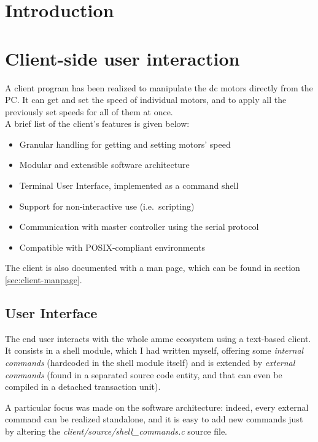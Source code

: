 \documentclass[binding=0.6cm,Lau]{sapthesis}
\begin{document}
\tableofcontents
\listoffigures
\listoftables

\mainmatter

\chapter{Introduction}
\label{ch:intro}


\chapter{Client-side user interaction}
\label{ch:client}
A client program has been realized to manipulate the dc motors directly from the
PC. It can get and set the speed of individual motors, and to apply all the
previously set speeds for all of them at once.\\ A brief list of the
client's features is given below:
\begin{itemize}
  \item Granular handling for getting and setting motors' speed
  \item Modular and extensible software architecture
  \item Terminal User Interface, implemented as a command shell
  \item Support for non-interactive use (i.e.\ scripting)
  \item Communication with master controller using the serial protocol
  \item Compatible with POSIX-compliant environments
\end{itemize}
The client is also documented with a man page, which can be found in section
\ref{sec:client-manpage}.

\section{User Interface}
The end user interacts with the whole ammc ecosystem using a text-based client.
It consists in a shell module, which I had written myself, offering some
\emph{internal commands} (hardcoded in the shell module itself) and is extended
by \emph{external commands} (found in a separated source code entity, and that
can even be compiled in a detached transaction unit).

A particular focus was made on the software architecture: indeed, every
external command can be realized standalone, and it is easy to add new
commands just by altering the \emph{client/source/shell\_commands.c} source
file.
\end{document}
